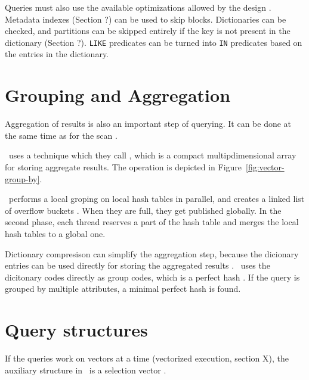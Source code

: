 Queries must also use the available optimizations allowed by the design \cite{Barber2012-xt}. Metadata indexes (Section ?) can be used to skip blocks. Dictionaries can be checked, and partitions can be skipped entirely if the key is not present in the dictionary (Section ?). \texttt{LIKE} predicates can be turned into \texttt{IN} predicates based on the entries in the dictionary.

\section{Grouping and Aggregation}
\label{sec:Grouping and Aggregation}
Aggregation of results is also an important step of querying. It can be done at the same time as for the scan \cite{Leme2010-is}.

\oracle~uses a technique which they call , which is a compact multipdimensional array for storing aggregate results. The operation is depicted in Figure~\ref{fig:vector-group-by}.

\ibm~performs a local groping on local hash tables in parallel, and creates a linked list of overflow buckets \cite{Raman2013-em}. When they are full, they get published globally. In the second phase, each thread reserves a part of the hash table and merges the local hash tables to a global one.

Dictionary compresison can simplify the aggregation step, because the dicionary entries can be used directly for storing the aggregated results \cite{Lemke2010-is, Boncz2005-wj}. \blink~uses the dicitonary codes directly as group codes, which is a perfect hash \cite{Raman2008-gi}. If the query is grouped by multiple attributes, a minimal perfect hash is found. 

\section{Query structures}
\label{sec:Query structures}
If the queries work on vectors at a time (vectorized execution, section X), the auxiliary structure in \monetx~is a selection vector \cite{Boncz2005-wj}.



